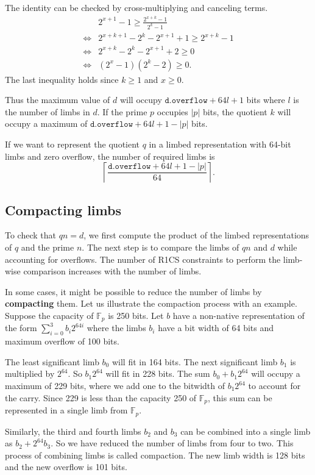 \documentclass[a4paper, 12pt]{article}
\begin{document}
The identity can be checked by cross-multiplying and canceling terms.
\begin{align*}
& 2^{x+1}-1 \ge \frac{2^{x+k}-1}{2^{k}-1} \\
\iff & 2^{x+k+1} - 2^k - 2^{x+1} +1 \ge 2^{x+k} -1 \\
\iff & 2^{x+k} - 2^k - 2^{x+1} + 2 \ge 0 \\
\iff & (2^x-1)(2^k-2) \ge 0.
\end{align*}
The last inequality holds since $k \ge 1$ and $x \ge 0$.

Thus the maximum value of $d$ will occupy $\texttt{d.overflow}+64l+1$ bits where $l$ is the number of limbs in $d$. If the prime $p$ occupies $|p|$ bits, the quotient $k$ will occupy a maximum of $\texttt{d.overflow}+64l+1 -|p|$ bits.

If we want to represent the quotient $q$  in a limbed representation with 64-bit limbs and zero overflow, the number of required limbs is
$$\left\lceil \frac{\texttt{d.overflow}+64l+1 -|p|}{64}\right\rceil.$$

\subsection{Compacting limbs}
To check that $qn = d$, we first compute the product of the limbed representations of $q$ and the prime $n$. The next step is to compare the limbs of $qn$ and $d$ while accounting for overflows. The number of R1CS constraints to perform the limb-wise comparison increases with the number of limbs.

In some cases, it might be possible to reduce the number of limbs by \textbf{compacting} them. Let us illustrate the compaction process with an example. Suppose the capacity of $\mathbb{F}_p$ is 250 bits. Let $b$ have a non-native representation of the form $\sum_{i=0}^3 b_i 2^{64i}$ where the limbs $b_i$ have a bit width of 64 bits and maximum overflow of 100 bits.

The least significant limb $b_0$ will fit in 164 bits. The next significant limb $b_1$ is multiplied by $2^{64}$. So $b_1 2^{64}$ will fit in 228 bits. The sum $b_0 + b_1 2^{64}$ will occupy a maximum of 229 bits, where we add one to the bitwidth of $b_1 2^{64}$ to account for the carry. Since 229 is less than the capacity 250 of $\mathbb{F}_p$, this sum can be represented in a single limb from $\mathbb{F}_p$.

Similarly, the third and fourth limbs $b_2$ and $b_3$ can be combined into a single limb as $b_2 + 2^{64} b_3$. So we have reduced the number of limbs from four to two. This process of combining limbs is called compaction. The new limb width is 128 bits and the new overflow is 101 bits.
\end{document}
